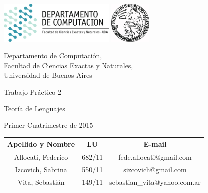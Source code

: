 \documentclass[a4paper, 10pt, twoside]{article}
\newcommand{\titulo}{Trabajo Práctico 2}
\newcommand{\materia}{Teoría de Lenguajes}
\newcommand{\cuatrimestre}{Primer Cuatrimestre de 2015}
\begin{document}


\thispagestyle{caratula}

\begin{center}

\includegraphics[height=2cm]{DC.png} 
\hfill
\includegraphics[height=2cm]{UBA.jpg} 

\vspace{2cm}

Departamento de Computación,\\
Facultad de Ciencias Exactas y Naturales,\\
Universidad de Buenos Aires

\vspace{4cm}

\begin{Huge}
\titulo
\end{Huge}

\vspace{0.5cm}

\begin{Large}
\materia
\end{Large}

\vspace{1cm}

\cuatrimestre

\vspace{4cm}

\begin{tabular}{|c|c|c|}
\hline
Apellido y Nombre & LU & E-mail\\
\hline
Allocati, Federico  & 682/11 & fede.allocati@gmail.com\\
Izcovich, Sabrina & 550/11 & sizcovich@gmail.com\\
Vita, Sebastián & 149/11 & sebastian\_vita@yahoo.com.ar\\
\hline
\end{tabular}

\end{center}
\end{document}
